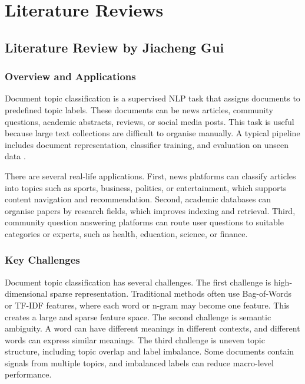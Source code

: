 \section{Literature Reviews}

\subsection{Literature Review by Jiacheng Gui}

\subsubsection{Overview and Applications}

Document topic classification is a supervised NLP task that assigns documents to predefined topic labels. These documents can be news articles, community questions, academic abstracts, reviews, or social media posts. This task is useful because large text collections are difficult to organise manually. A typical pipeline includes document representation, classifier training, and evaluation on unseen data \cite{sebastiani2002machine}.

There are several real-life applications. First, news platforms can classify articles into topics such as sports, business, politics, or entertainment, which supports content navigation and recommendation. Second, academic databases can organise papers by research fields, which improves indexing and retrieval. Third, community question answering platforms can route user questions to suitable categories or experts, such as health, education, science, or finance.

\subsubsection{Key Challenges}

Document topic classification has several challenges. The first challenge is high-dimensional sparse representation. Traditional methods often use Bag-of-Words or TF-IDF features, where each word or n-gram may become one feature. This creates a large and sparse feature space. The second challenge is semantic ambiguity. A word can have different meanings in different contexts, and different words can express similar meanings. The third challenge is uneven topic structure, including topic overlap and label imbalance. Some documents contain signals from multiple topics, and imbalanced labels can reduce macro-level performance.

